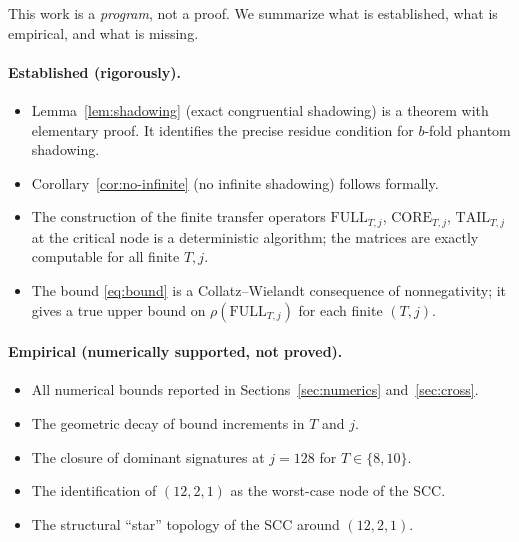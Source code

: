 \documentclass[11pt,a4paper]{article}
\theoremstyle{definition}
\newcommand{\full}{\mathrm{FULL}}
\newcommand{\core}{\mathrm{CORE}}
\newcommand{\tail}{\mathrm{TAIL}}
\newcommand{\spec}{\rho}
\begin{document}
This work is a \emph{program}, not a proof. We summarize what is
established, what is empirical, and what is missing.

\paragraph{Established (rigorously).}
\begin{itemize}
  \item Lemma~\ref{lem:shadowing} (exact congruential shadowing)
        is a theorem with elementary proof. It identifies the
        precise residue condition for $b$-fold phantom shadowing.
  \item Corollary~\ref{cor:no-infinite} (no infinite shadowing)
        follows formally.
  \item The construction of the finite transfer operators
        $\full_{T,j}$, $\core_{T,j}$, $\tail_{T,j}$ at the critical
        node is a deterministic algorithm; the matrices are
        exactly computable for all finite $T, j$.
  \item The bound \eqref{eq:bound} is a Collatz--Wielandt
        consequence of nonnegativity; it gives a true upper bound
        on $\spec(\full_{T,j})$ for each finite $(T, j)$.
\end{itemize}

\paragraph{Empirical (numerically supported, not proved).}
\begin{itemize}
  \item All numerical bounds reported in
        Sections~\ref{sec:numerics} and~\ref{sec:cross}.
  \item The geometric decay of bound increments in $T$ and $j$.
  \item The closure of dominant signatures at $j = 128$ for
        $T \in \{8, 10\}$.
  \item The identification of $(12, 2, 1)$ as the worst-case node
        of the SCC.
  \item The structural ``star'' topology of the SCC around
        $(12, 2, 1)$.
\end{itemize}
\end{document}

